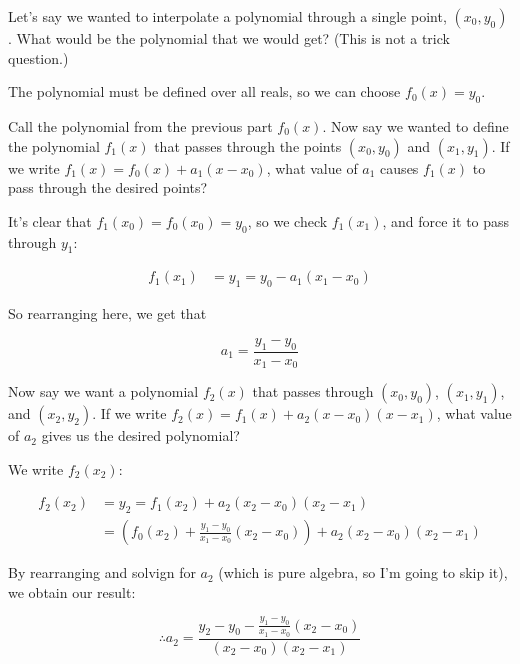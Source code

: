 \documentclass[11pt]{article}
\begin{document}
\begin{Parts}

	\Part Let's say we wanted to interpolate a polynomial through a single point, $(x_0, y_0)$.  What would be the polynomial that we would get?  (This is not a trick question.)

    \begin{solution}
        The polynomial must be defined over all reals, so we can choose $f_0(x) = y_0$.
    \end{solution}
	
	\Part Call the polynomial from the previous part $f_0(x)$.  Now say we wanted to define the polynomial $f_1(x)$ that passes through the points $(x_0, y_0)$ and $(x_1, y_1)$.  If we write $f_1(x) = f_0(x) + a_1(x - x_0)$, what value of $a_1$ causes $f_1(x)$ to pass through the desired points?

    \begin{solution}
        It's clear that $f_1(x_0) = f_0(x_0) = y_0$, so we check $f_1(x_1)$, and force it to pass through $y_1$: 

        \begin{align*}
            f_1(x_1) &= y_1 = y_0 - a_1(x_1 - x_0)
        \end{align*}

        So rearranging here, we get that 

        \[ a_1 = \frac{y_1 - y_0}{x_1 - x_0}\]


    \end{solution}
	
	\Part Now say we want a polynomial $f_2(x)$ that passes through $(x_0, y_0)$, $(x_1, y_1)$, and $(x_2, y_2)$.  If we write $f_2(x) = f_1(x) + a_2(x - x_0)(x - x_1)$, what value of $a_2$ gives us the desired polynomial?

    \begin{solution}
        We write $f_2(x_2)$: 

        \begin{align*}
            f_2(x_2) &= y_2 = f_1(x_2) + a_2(x_2 - x_0)(x_2 - x_1)\\
            &= \left( f_0(x_2) + \frac{y_1 - y_0}{x_1 - x_0} (x_2 - x_0)\right) + a_2(x_2 - x_0)(x_2 - x_1)
        \end{align*}

        By rearranging and solvign for $a_2$ (which is pure algebra, so I'm going to skip it), we obtain our result: 

        \[
            \therefore a_2 = \frac{y_2 - y_0 - \frac{y_1 - y_0}{x_1 - x_0}(x_2 - x_0)}{(x_2 - x_0)(x_2 - x_1)}\]
    \end{solution}




\end{Parts}
\end{document}
